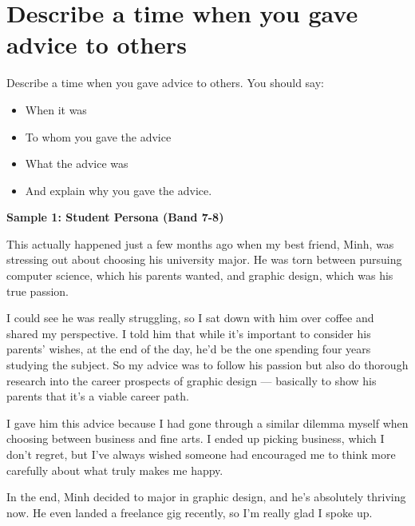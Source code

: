 \section{Describe a time when you gave advice to others}
\begin{ieltsprompt}
Describe a time when you gave advice to others.
You should say:
\begin{itemize}[leftmargin=2em, itemsep=2pt]
\item When it was
\item To whom you gave the advice
\item What the advice was
\item And explain why you gave the advice.
\end{itemize}
\end{ieltsprompt}
\begin{ieltsanswer}
\textbf{Sample 1: Student Persona (Band 7-8)}

This actually happened just a few months ago when my best friend, Minh, was stressing out about choosing his university major. He was torn between pursuing computer science, which his parents wanted, and graphic design, which was his true passion.

I could see he was really struggling, so I sat down with him over coffee and shared my perspective. I told him that while it's important to consider his parents' wishes, at the end of the day, he'd be the one spending four years studying the subject. So my advice was to follow his passion but also do thorough research into the career prospects of graphic design — basically to show his parents that it's a viable career path.

I gave him this advice because I had gone through a similar dilemma myself when choosing between business and fine arts. I ended up picking business, which I don't regret, but I've always wished someone had encouraged me to think more carefully about what truly makes me happy.

In the end, Minh decided to major in graphic design, and he's absolutely thriving now. He even landed a freelance gig recently, so I'm really glad I spoke up.
\end{ieltsanswer}


